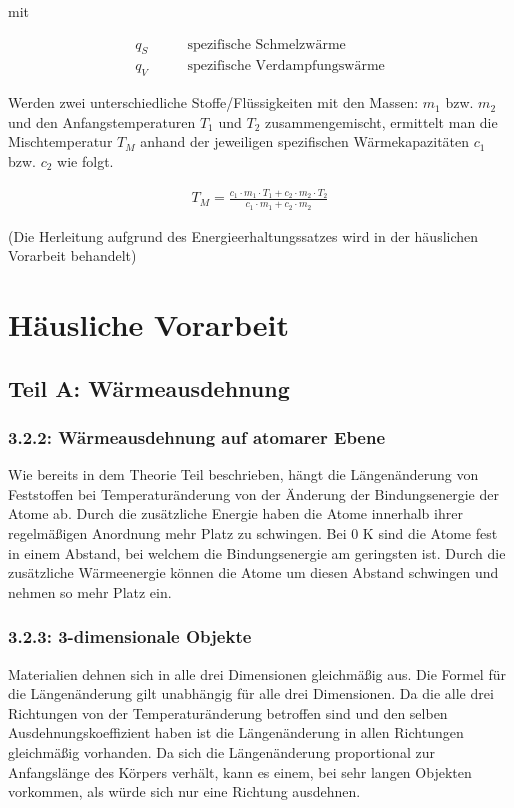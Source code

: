 \documentclass[a4paper]{scrartcl}
\numberwithin{equation}{subsection}
\begin{document}
mit 

\begin{align*}
q_S \qquad 	& \text{spezifische Schmelzwärme} \\
q_V	\qquad 	& \text{spezifische Verdampfungswärme}
\end{align*}

Werden zwei unterschiedliche Stoffe/Flüssigkeiten mit den Massen: $m_1$ bzw. $m_2$
und den Anfangstemperaturen $T_1$ und $T_2$ zusammengemischt, ermittelt man die Mischtemperatur
$T_M$ anhand der jeweiligen spezifischen Wärmekapazitäten $c_1$ bzw. $c_2$ wie folgt. \cite{anl}

\begin{align}
T_M = \frac{c_1 \cdot m_1 \cdot T_1 + c_2 \cdot m_2 \cdot T_2}{c_1 \cdot m_1 + c_2 \cdot m_2}
\end{align}

(Die Herleitung aufgrund des Energieerhaltungssatzes wird in der häuslichen Vorarbeit behandelt)

\newpage
\section{Häusliche Vorarbeit}
\subsection{Teil A: Wärmeausdehnung}
\subsubsection{3.2.2: Wärmeausdehnung auf atomarer Ebene}
Wie bereits in dem Theorie Teil beschrieben, hängt die Längenänderung von Feststoffen bei Temperaturänderung von der Änderung der Bindungsenergie der Atome ab. Durch die zusätzliche Energie haben die Atome innerhalb ihrer regelmäßigen Anordnung mehr Platz zu schwingen. Bei 0 K sind die Atome fest in einem Abstand, bei welchem die Bindungsenergie am geringsten ist. Durch die zusätzliche Wärmeenergie können die Atome um diesen Abstand schwingen und nehmen so mehr Platz ein.

\subsubsection{3.2.3: 3-dimensionale Objekte}
Materialien dehnen sich in alle drei Dimensionen gleichmäßig aus. Die Formel für die Längenänderung gilt unabhängig für alle drei Dimensionen. Da die alle drei Richtungen von der Temperaturänderung betroffen sind und den selben Ausdehnungskoeffizient haben ist die Längenänderung in allen Richtungen gleichmäßig vorhanden. Da sich die Längenänderung proportional zur Anfangslänge des Körpers verhält, kann es einem, bei sehr langen Objekten vorkommen, als würde sich nur eine Richtung ausdehnen.
\end{document}
